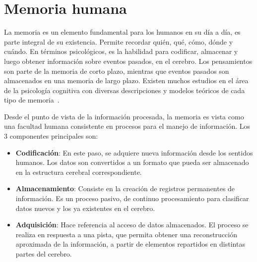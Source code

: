







\section{Memoria humana}\label{sec:human_memory}

La memoria es un elemento fundamental para los humanos en su día a día, es parte integral de su existencia. Permite recordar quién, qué, cómo, dónde y cuándo. En términos psicológicos, es la habilidad para codificar, almacenar y luego obtener información sobre eventos pasados, en el cerebro. Los pensamientos son parte de la memoria de corto plazo, mientras que eventos pasados son almacenados en una memoria de largo plazo. Existen muchos estudios en el área de la psicología cognitiva con diversas descripciones y modelos teóricos de cada tipo de memoria~\cite{Vijayakumar2014}.

Desde el punto de vista de la información procesada, la memoria es vista como una facultad humana consistente en procesos para el manejo de información. Los 3 componentes principales son:

\begin{itemize}[topsep=0pt]
	\setlength\itemsep{0.2em}
	\item \textbf{Codificación}: En este paso, se adquiere nueva información desde los sentidos humanos. Los datos son convertidos a un formato que pueda ser almacenado en la estructura cerebral correspondiente.
	\item \textbf{Almacenamiento}: Consiste en la creación de registros permanentes de información. Es un proceso pasivo, de continuo procesamiento para clasificar datos nuevos y los ya existentes en el cerebro.
	\item \textbf{Adquisición}: Hace referencia al acceso de datos almacenados. El proceso se realiza en respuesta a una pista, que permita obtener una reconstrucción aproximada de la información, a partir de elementos repartidos en distintas partes del cerebro.
\end{itemize}

